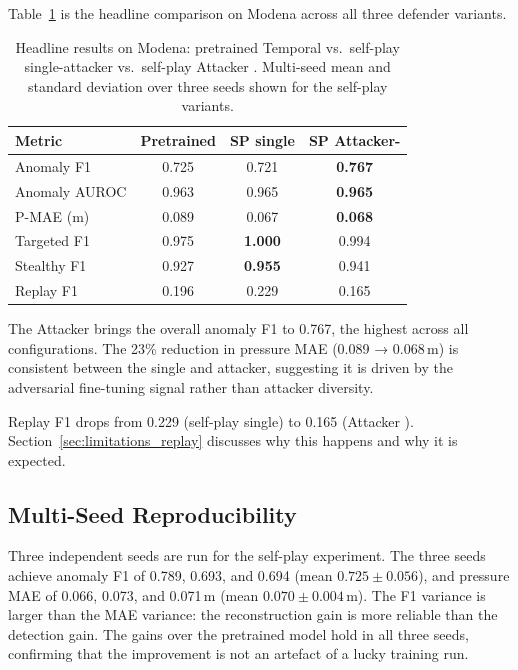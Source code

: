 Table~\ref{tab:atkmoe_headline} is the headline comparison on Modena
across all three defender variants.

\begin{table}[htbp]
  \centering
  \caption{Headline results on Modena: pretrained Temporal \moe{}
  vs.\ self-play single-attacker vs.\ self-play Attacker \moe{}.
  Multi-seed mean and standard deviation over three seeds shown for
  the self-play variants.}
  \label{tab:atkmoe_headline}
  \begin{tabular}{lccc}
    \toprule
    Metric & Pretrained & SP single & SP Attacker-\moe{} \\
    \midrule
    Anomaly F1    & 0.725 & 0.721 & \textbf{0.767} \\
    Anomaly AUROC & 0.963 & 0.965 & \textbf{0.965} \\
    P-MAE (m)     & 0.089 & 0.067 & \textbf{0.068} \\
    Targeted F1   & 0.975 & \textbf{1.000} & 0.994 \\
    Stealthy F1   & 0.927 & \textbf{0.955} & 0.941 \\
    Replay F1     & 0.196 & 0.229 & 0.165 \\
    \bottomrule
  \end{tabular}
\end{table}

The Attacker \moe{} brings the overall anomaly F1 to 0.767, the
highest across all configurations. The 23\% reduction in pressure
MAE (0.089 → 0.068\,m) is consistent between the single
and \moe{} attacker, suggesting it is driven by the adversarial
fine-tuning signal rather than attacker diversity.

Replay F1 drops from 0.229 (self-play single) to 0.165 (Attacker \moe{}).
Section~\ref{sec:limitations_replay} discusses why this happens and
why it is expected.

\subsection{Multi-Seed Reproducibility}

Three independent seeds are run for the self-play \moe{} experiment.
The three seeds achieve anomaly F1 of 0.789, 0.693, and 0.694 (mean
$0.725 \pm 0.056$), and pressure MAE of 0.066, 0.073,
and 0.071\,m (mean $0.070 \pm 0.004$\,m). The F1 variance is larger
than the MAE variance: the reconstruction gain is more
reliable than the detection gain. The gains over the pretrained model
hold in all three seeds, confirming that the improvement is not an
artefact of a lucky training run.

